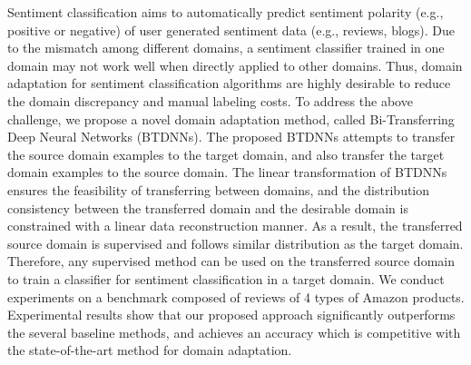Sentiment classification aims to automatically predict sentiment polarity (e.g., positive or negative) of user generated sentiment data (e.g., reviews, blogs). Due to the mismatch among different domains, a sentiment classifier trained in one domain may not work well when directly applied to other domains. Thus, domain adaptation for sentiment classification algorithms are highly desirable to reduce the domain discrepancy and manual labeling costs. To address the above challenge, we propose a novel domain adaptation method, called Bi-Transferring Deep Neural Networks (BTDNNs). The proposed BTDNNs attempts to transfer the source domain examples to the target domain, and also transfer the target domain examples to the source domain. The linear transformation of BTDNNs ensures the feasibility of transferring between domains, and the distribution consistency between the transferred domain and the desirable domain is constrained with a linear data reconstruction manner. As a result, the transferred source domain is supervised and follows similar distribution as the target domain. Therefore, any supervised method can be used on the transferred source domain to train a classifier for sentiment classification in a target domain. We conduct experiments on a benchmark composed of reviews of 4 types of Amazon products. Experimental results show that our proposed approach significantly outperforms the several baseline methods, and achieves an accuracy which is competitive with the state-of-the-art method for domain adaptation.
